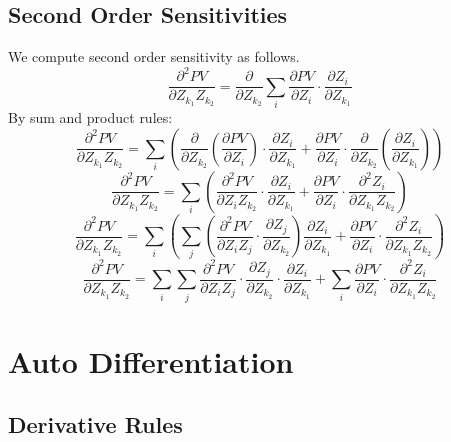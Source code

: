 \documentclass[11pt, oneside]{article}
\begin{document}
\subsection{Second Order Sensitivities}
We compute second order sensitivity as follows.
\begin{equation}
\frac{\partial^2 PV}{\partial Z_{k_1} Z_{k_2}} = \frac{\partial}{\partial Z_{k_2}} \sum_{i} \frac{\partial PV}{\partial Z_i} \cdot \frac{\partial Z_i}{\partial Z_{k_1}} 
\end{equation}
By sum and product rules:
\begin{equation}
\frac{\partial^2 PV}{\partial Z_{k_1} Z_{k_2}} = \sum_{i}(\frac{\partial}{\partial Z_{k_2}} (\frac{\partial PV}{\partial Z_i}) \cdot \frac{\partial Z_i}{\partial Z_{k_1}} + \frac{\partial PV}{\partial Z_i} \cdot \frac{\partial}{\partial Z_{k_2}} (\frac{\partial Z_i}{\partial Z_{k_1}}) )
\end{equation}
\begin{equation}
\frac{\partial^2 PV}{\partial Z_{k_1} Z_{k_2}} = \sum_{i}( \frac{\partial^2 PV}{\partial Z_i Z_{k_2}} \cdot \frac{\partial Z_i}{\partial Z_{k_1}} + \frac{\partial PV}{\partial Z_i} \cdot \frac{\partial^2 Z_i}{\partial Z_{k_1} Z_{k_2}} )
\end{equation}
\begin{equation}
\frac{\partial^2 PV}{\partial Z_{k_1} Z_{k_2}} = \sum_{i}( \sum_{j} (\frac{\partial^2 PV}{\partial Z_i Z_j} \cdot \frac{\partial Z_j}{\partial Z_{k_2}} ) \frac{\partial Z_i}{\partial Z_{k_1}} + \frac{\partial PV}{\partial Z_i} \cdot \frac{\partial^2 Z_i}{\partial Z_{k_1} Z_{k_2}} )
\end{equation}
\begin{equation}
\frac{\partial^2 PV}{\partial Z_{k_1} Z_{k_2}} = \sum_{i} \sum_{j} \frac{\partial^2 PV}{\partial Z_i Z_j} \cdot \frac{\partial Z_j}{\partial Z_{k_2}} \cdot \frac{\partial Z_i}{\partial Z_{k_1}} + \sum_{i} \frac{\partial PV}{\partial Z_i} \cdot \frac{\partial^2 Z_i}{\partial Z_{k_1} Z_{k_2}} 
\end{equation}

\section{Auto Differentiation}

\subsection{Derivative Rules}
\end{document}
